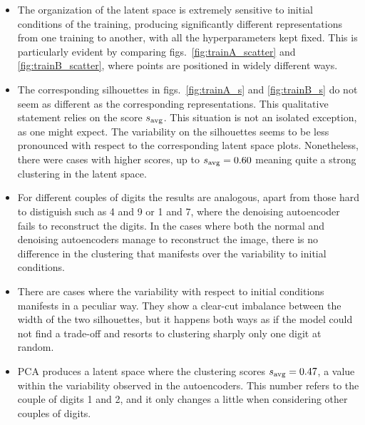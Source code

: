 \documentclass[twocolumn,gsifonts,twoside]{gsipaper}
\begin{document}
\begin{itemize}
\item The organization of the latent space is extremely sensitive to initial conditions of the training, producing significantly different representations from one training to another, with all the hyperparameters kept fixed. This is particularly evident by comparing figs.~\ref{fig:trainA_scatter} and \ref{fig:trainB_scatter}, where points are positioned in widely different ways.

\item The corresponding silhouettes in figs.~\ref{fig:trainA_s} and \ref{fig:trainB_s} do not seem as different as the corresponding representations. This qualitative statement relies on the score $s_\textup{avg}$. This situation is not an isolated exception, as one might expect. The variability on the silhouettes seems to be less pronounced with respect to the corresponding latent space plots. Nonetheless, there were cases with higher scores, up to $s_\textup{avg} = 0.60$ meaning quite a strong clustering in the latent space.

\item For different couples of digits the results are analogous, apart from those hard to distiguish such as 4 and 9 or 1 and 7, where the denoising autoencoder fails to reconstruct the digits. In the cases where both the normal and denoising autoencoders manage to reconstruct the image, there is no difference in the clustering that manifests over the variability to initial conditions.

\item There are cases where the variability with respect to initial conditions manifests in a peculiar way. They show a clear-cut imbalance between the width of the two silhouettes, but it happens both ways as if the model could not find a trade-off and resorts to clustering sharply only one digit at random.

\item PCA produces a latent space where the clustering scores $s_\textup{avg} = 0.47$, a value within the variability observed in the autoencoders. This number refers to the couple of digits 1 and 2, and it only changes a little when considering other couples of digits.
\end{itemize}
\end{document}
